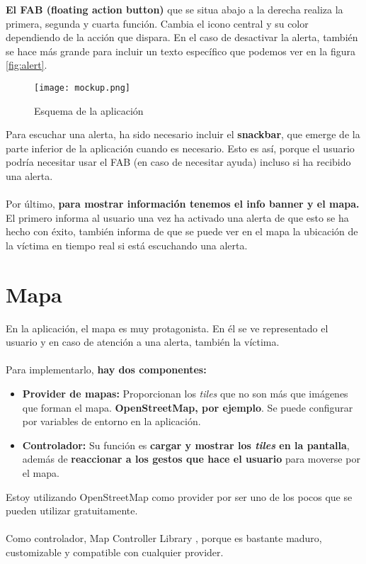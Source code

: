 \textbf{El FAB (floating action button)} que se situa abajo a la derecha realiza la primera, segunda y cuarta función. 
Cambia el icono central y su color dependiendo de la acción que dispara. En el caso de desactivar la alerta,
también se hace más grande para incluir un texto específico que podemos ver en la figura \ref{fig:alert}.

\begin{figure}[H]
	\centering	
	\texttt{[image: mockup.png]}
	\caption{Esquema de la aplicación}
	\end{figure}

Para escuchar una alerta, ha sido necesario incluir el \textbf{snackbar}, que emerge de la parte inferior de la aplicación cuando es necesario.
Esto es así, porque el usuario podría necesitar usar el FAB (en caso de necesitar ayuda) incluso si ha recibido una alerta. \\ \\

Por último, \textbf{para mostrar información tenemos el info banner y el mapa.} El primero informa al usuario una vez ha activado
una alerta de que esto se ha hecho con éxito, también informa de que se puede ver en el mapa la ubicación de la víctima en tiempo real
si está escuchando una alerta.

\section{Mapa}
En la aplicación, el mapa es muy protagonista. En él se ve representado el usuario y en caso de
atención a una alerta, también la víctima. \\ \\
Para implementarlo, \textbf{hay dos componentes:}
 \begin{itemize}
   \item \textbf{Provider de mapas:} Proporcionan los \textit{tiles} que no son más que imágenes que forman el mapa. \textbf{OpenStreetMap, por ejemplo}. Se puede configurar por variables de entorno en la aplicación.
   \item \textbf{Controlador:} Su función es \textbf{cargar y mostrar los \textit{tiles} en la pantalla}, además de \textbf{reaccionar a los gestos que hace el usuario} para moverse por el mapa. 
 \end{itemize}

 Estoy utilizando OpenStreetMap como provider \cite{openstreetmap} por ser uno de los pocos que se pueden utilizar gratuitamente. \\ \\
 Como controlador, Map Controller Library \cite{map}, porque es bastante maduro, customizable y compatible con cualquier provider.

